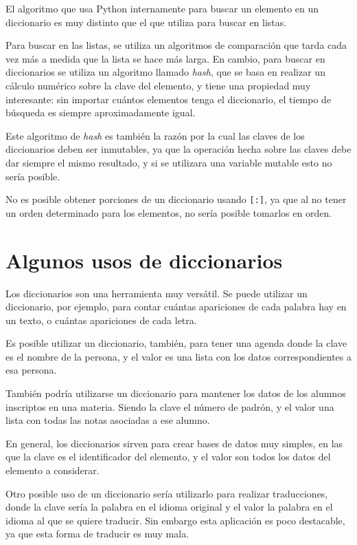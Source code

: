 \begin{sabias_que}
El algoritmo que usa Python internamente para buscar un elemento en un
diccionario es muy distinto que el que utiliza para buscar en listas.

Para buscar en las listas, se utiliza un algoritmos de comparación que
tarda cada vez más a medida que la lista se hace más larga.  En cambio,
para buscar en diccionarios se utiliza un algoritmo llamado {\it hash},
que se basa en realizar un cálculo numérico sobre la clave del elemento,
y tiene una propiedad muy interesante: sin importar cuántos elementos
tenga el diccionario, el tiempo de búsqueda es siempre aproximadamente
igual.

Este algoritmo de {\it hash} es también la razón por la cual las claves de
los diccionarios deben ser inmutables, ya que la operación hecha sobre las
claves debe dar siempre el mismo resultado, y si se utilizara una variable
mutable esto no sería posible.
\end{sabias_que}

No es posible obtener porciones de un diccionario usando \lstinline![:]!,
ya que al no tener un orden determinado para los elementos, no sería
posible tomarlos en orden.

\section{Algunos usos de diccionarios}

Los diccionarios son una herramienta muy versátil.  Se puede utilizar un
diccionario, por ejemplo, para contar cuántas apariciones de cada palabra
hay en un texto, o cuántas apariciones de cada letra.

Es posible utilizar un diccionario, también, para tener una agenda donde la
clave es el nombre de la persona, y el valor es una lista con los datos
correspondientes a esa persona.

También podría utilizarse un diccionario para mantener los datos de los
alumnos inscriptos en una materia.  Siendo la clave el número de padrón, y
el valor una lista con todas las notas asociadas a ese alumno.

En general, los diccionarios sirven para crear bases de datos muy simples,
en las que la clave es el identificador del elemento, y el valor son todos
los datos del elemento a considerar.

Otro posible uso de un diccionario sería utilizarlo para realizar
traducciones, donde la clave sería la palabra en el idioma original y el
valor la palabra en el idioma al que se quiere traducir.  Sin embargo esta
aplicación es poco destacable, ya que esta forma de traducir es muy mala.

